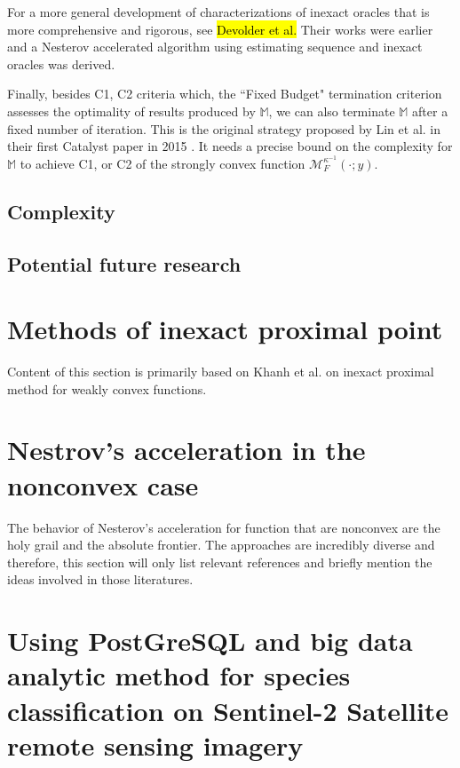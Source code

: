 \documentclass[12pt]{article}
\begin{document}
            \par 
            For a more general development of characterizations of inexact oracles that is more comprehensive and rigorous, see 
            {\hl{Devolder et al.}}
            Their works were earlier and a Nesterov accelerated algorithm using estimating sequence and inexact oracles was derived. 
            \par
            Finally, besides C1, C2 criteria which, the ``Fixed Budget" termination criterion assesses the optimality of results produced by $\mathbb M$, we can also terminate $\mathbb M$ after a fixed number of iteration. 
            This is the original strategy proposed by Lin et al. in their first Catalyst paper in 2015 \cite{lin_universal_2015}. 
            It needs a precise bound on the complexity for $\mathbb M$ to achieve C1, or C2 of the strongly convex function $\mathcal M^{\kappa^{-1}}_F(\cdot; y)$. 
            \par
            


    \subsection{Complexity}
        
        
    \subsection{Potential future research}

    
\section{Methods of inexact proximal point}\label{sec:inexact-prox}
    Content of this section is primarily based on Khanh et al. \cite{duy_khanh_inexact_2023} on inexact proximal method for weakly convex functions. 


\section{Nestrov's acceleration in the nonconvex case}\label{sec:nes-acc-ncnvx}
    The behavior of Nesterov's acceleration for function that are nonconvex are the holy grail and the absolute frontier. 
    The approaches are incredibly diverse and therefore, this section will only list relevant references and briefly mention the ideas involved in those literatures. 


\section{Using PostGreSQL and big data analytic method for species classification on Sentinel-2 Satellite remote sensing imagery}




\newpage

\appendix
\end{document}
